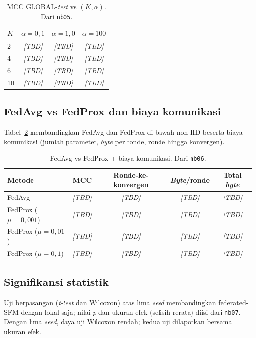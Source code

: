 \documentclass[11pt,a4paper]{article}
\newcommand{\TBD}{\textit{[TBD]}}
\begin{document}
\begin{table}[t]
\centering
\caption{MCC GLOBAL-\emph{test} vs $(K,\alpha)$. Dari \texttt{nb05}.}
\label{tab:noniid}
\begin{tabular}{lccc}
\toprule
$K$ & $\alpha=0{,}1$ & $\alpha=1{,}0$ & $\alpha=100$ \\
\midrule
2  & \TBD & \TBD & \TBD \\
4  & \TBD & \TBD & \TBD \\
6  & \TBD & \TBD & \TBD \\
10 & \TBD & \TBD & \TBD \\
\bottomrule
\end{tabular}
\end{table}

\subsection{FedAvg vs FedProx dan biaya komunikasi}
Tabel~\ref{tab:comm} membandingkan FedAvg dan FedProx di bawah non-IID beserta
biaya komunikasi (jumlah parameter, \emph{byte} per ronde, ronde hingga konvergen).

\begin{table}[t]
\centering
\caption{FedAvg vs FedProx + biaya komunikasi. Dari \texttt{nb06}.}
\label{tab:comm}
\begin{tabular}{lcccc}
\toprule
Metode & MCC & Ronde-ke-konvergen & \emph{Byte}/ronde & Total \emph{byte} \\
\midrule
FedAvg          & \TBD & \TBD & \TBD & \TBD \\
FedProx ($\mu{=}0{,}001$) & \TBD & \TBD & \TBD & \TBD \\
FedProx ($\mu{=}0{,}01$)  & \TBD & \TBD & \TBD & \TBD \\
FedProx ($\mu{=}0{,}1$)   & \TBD & \TBD & \TBD & \TBD \\
\bottomrule
\end{tabular}
\end{table}

\subsection{Signifikansi statistik}
Uji berpasangan (\emph{t-test} dan Wilcoxon) atas lima \emph{seed} membandingkan
federated-SFM dengan lokal-saja; nilai $p$ dan ukuran efek (selisih rerata) diisi
dari \texttt{nb07}. Dengan lima \emph{seed}, daya uji Wilcoxon rendah; kedua uji
dilaporkan bersama ukuran efek.

\FloatBarrier
\end{document}
